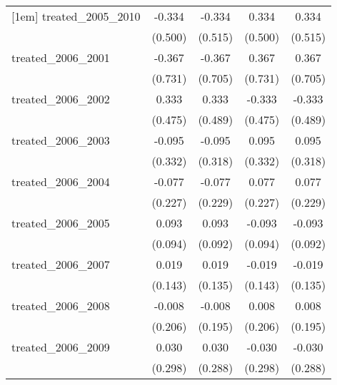 {\begin{tabular}{l*{4}{c}}
[1em]
treated\_2005\_2010&      -0.334         &      -0.334         &       0.334         &       0.334         \\
            &     (0.500)         &     (0.515)         &     (0.500)         &     (0.515)         \\
[1em]
treated\_2006\_2001&      -0.367         &      -0.367         &       0.367         &       0.367         \\
            &     (0.731)         &     (0.705)         &     (0.731)         &     (0.705)         \\
[1em]
treated\_2006\_2002&       0.333         &       0.333         &      -0.333         &      -0.333         \\
            &     (0.475)         &     (0.489)         &     (0.475)         &     (0.489)         \\
[1em]
treated\_2006\_2003&      -0.095         &      -0.095         &       0.095         &       0.095         \\
            &     (0.332)         &     (0.318)         &     (0.332)         &     (0.318)         \\
[1em]
treated\_2006\_2004&      -0.077         &      -0.077         &       0.077         &       0.077         \\
            &     (0.227)         &     (0.229)         &     (0.227)         &     (0.229)         \\
[1em]
treated\_2006\_2005&       0.093         &       0.093         &      -0.093         &      -0.093         \\
            &     (0.094)         &     (0.092)         &     (0.094)         &     (0.092)         \\
[1em]
treated\_2006\_2007&       0.019         &       0.019         &      -0.019         &      -0.019         \\
            &     (0.143)         &     (0.135)         &     (0.143)         &     (0.135)         \\
[1em]
treated\_2006\_2008&      -0.008         &      -0.008         &       0.008         &       0.008         \\
            &     (0.206)         &     (0.195)         &     (0.206)         &     (0.195)         \\
[1em]
treated\_2006\_2009&       0.030         &       0.030         &      -0.030         &      -0.030         \\
            &     (0.298)         &     (0.288)         &     (0.298)         &     (0.288)         \\

\end{tabular}}
